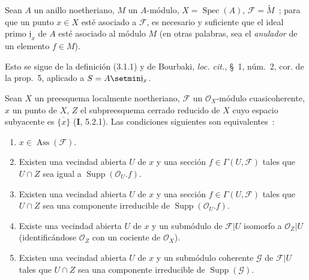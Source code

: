 \begin{proposition}[3.1.2]
\label{IV.2.3.1.2-fr}
Sean $A$ un anillo noetheriano, $M$ un $A$-módulo,
$X=\operatorname{Spec}(A)$, $\mathcal F=\widetilde M$~; para que un punto
$x\in X$ esté asociado a $\mathcal F$, es necesario y suficiente que el ideal
primo $\mathfrak j_x$ de $A$ esté asociado al módulo $M$ \textup{(en otras palabras,
sea el \emph{anulador} de un elemento $f\in M$)}.
\end{proposition}

Esto se sigue de la definición (3.1.1) y de Bourbaki, \emph{loc. cit.},
\S~1, núm.~2, cor. de la prop.~5, aplicado a
$S=A\setmin\mathfrak j_x$.

\begin{proposition}[3.1.3]
\label{IV.2.3.1.3-fr}
Sean $X$ un preesquema localmente noetheriano, $\mathcal F$ un
$\mathcal O_X$-módulo cuasicoherente, $x$ un punto de $X$, $Z$ el
subpreesquema cerrado reducido de $X$ cuyo espacio subyacente es
$\overline{\{x\}}$ \textup{(\textbf I, 5.2.1)}. Las condiciones siguientes son equivalentes~:
\begin{enumerate}
\item[\emph{a)}] $x\in\operatorname{Ass}(\mathcal F)$.

\item[\emph{b)}] Existen una vecindad abierta $U$ de $x$ y una sección
$f\in\Gamma(U,\mathcal F)$ tales que $U\cap Z$ sea igual a
$\operatorname{Supp}(\mathcal O_U.f)$.
\item[\emph{b$'$)}] Existen una vecindad abierta $U$ de $x$ y una sección
$f\in\Gamma(U,\mathcal F)$ tales que $U\cap Z$ sea una componente
irreducible de $\operatorname{Supp}(\mathcal O_U.f)$.
\item[\emph{c)}] Existe una vecindad abierta $U$ de $x$ y un submódulo de
$\mathcal F|U$ isomorfo a $\mathcal O_Z|U$ \textup{(identificándose
$\mathcal O_Z$ con un cociente de $\mathcal O_X$)}.
\item[\emph{c$'$)}] Existen una vecindad abierta $U$ de $x$ y un submódulo
coherente $\mathcal G$ de $\mathcal F|U$ tales que $U\cap Z$ sea una
componente irreducible de $\operatorname{Supp}(\mathcal G)$.
\end{enumerate}
\end{proposition}

